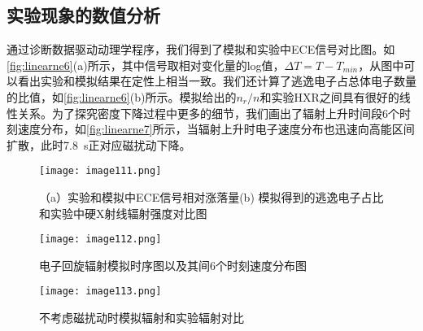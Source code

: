 \subsection{实验现象的数值分析}
通过诊断数据驱动动理学程序，我们得到了模拟和实验中ECE信号对比图。如\autoref{fig:linearne6}(a)所示，其中信号取相对变化量的log值，$ΔT=T-T_{min}$，从图中可以看出实验和模拟结果在定性上相当一致。我们还计算了逃逸电子占总体电子数量的比值，如\autoref{fig:linearne6}(b)所示。模拟给出的$n_r/n$和实验HXR之间具有很好的线性关系。为了探究密度下降过程中更多的细节，我们画出了辐射上升时间段6个时刻速度分布，如\autoref{fig:linearne7}所示，当辐射上升时电子速度分布也迅速向高能区间扩散，此时7.8~s正对应磁扰动下降。

\begin{figure}
\centering
\texttt{[image: image111.png]}
\caption{\label{fig:linearne6}（a）实验和模拟中ECE信号相对涨落量(b) 模拟得到的逃逸电子占比和实验中硬X射线辐射强度对比图}
\end{figure}

\begin{figure}
\centering
\texttt{[image: image112.png]}
\caption{\label{fig:linearne7}电子回旋辐射模拟时序图以及其间6个时刻速度分布图}
\end{figure}

\begin{figure}
\centering
\texttt{[image: image113.png]}
\caption{\label{fig:linearne8}不考虑磁扰动时模拟辐射和实验辐射对比}
\end{figure}

